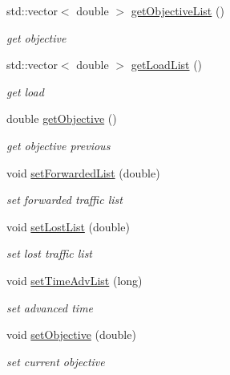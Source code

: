 \begin{DoxyCompactItemize}
std::vector$<$ double $>$ \hyperlink{classstatistics_a47b6c911143330c41faa573bc534aee1}{getObjectiveList} ()
\begin{DoxyCompactList}\small\item\em get objective \item\end{DoxyCompactList}\item 
std::vector$<$ double $>$ \hyperlink{classstatistics_a170d529ea5d3c459755309e2de1d166e}{getLoadList} ()
\begin{DoxyCompactList}\small\item\em get load \item\end{DoxyCompactList}\item 
double \hyperlink{classstatistics_a8a09566df54f2ac183e0a40f452546a6}{getObjective} ()
\begin{DoxyCompactList}\small\item\em get objective previous \item\end{DoxyCompactList}\item 
void \hyperlink{classstatistics_a94f979fcc6d511583638d6fc12116992}{setForwardedList} (double)
\begin{DoxyCompactList}\small\item\em set forwarded traffic list \item\end{DoxyCompactList}\item 
void \hyperlink{classstatistics_a84bead3d62e23af1777b5e54c6de48de}{setLostList} (double)
\begin{DoxyCompactList}\small\item\em set lost traffic list \item\end{DoxyCompactList}\item 
void \hyperlink{classstatistics_ad738c092d2d09223d4c9853c2859d7cd}{setTimeAdvList} (long)
\begin{DoxyCompactList}\small\item\em set advanced time \item\end{DoxyCompactList}\item 
void \hyperlink{classstatistics_ab2fd434123379e7814c21bc38ff2bb20}{setObjective} (double)
\begin{DoxyCompactList}\small\item\em set current objective \item\end{DoxyCompactList}\item 

\end{DoxyCompactItemize}
